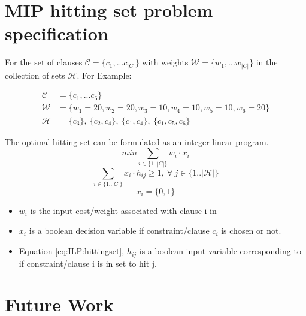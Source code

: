 \documentclass{article}
\newcommand\m[1]{\mathcal{#1}}
\begin{document}
\newpage
\section{MIP hitting set problem specification}
For the set of clauses $ \m{C} = \{c_1, ... c_{|C|}\}$ with weights $\m{W} = \{w_1, ... w_{|C|}\}$ in the collection of sets $\m{H}$. For Example:

\begin{equation} \label{mip:example}
  \begin{split}
    \m{C} &= \{c_1, ... c_6 \}  \\
    \m{W} &= \{w_1 = 20, w_2 = 20,  w_3 = 10,  w_4 = 10,  w_5 = 10,  w_6 = 20\} \\
    \m{H} &= \{c_3 \},\ \{c_2, c_4\},\ \{c_1, c_4\},\ \{c_1, c_5, c_6\} 
  \end{split}
  \end{equation}

The optimal hitting set can be formulated as an integer linear program.
\begin{equation} \label{eq:ILP:objective}
  min \sum_{ i \in \{1..|C|\}} w_i \cdot x_i
\end{equation}
\begin{equation} \label{eq:ILP:hittingset}
  \sum_{i \in \{1..|C|\}} x_i \cdot h_{ij} \geq 1, \  \forall \ j \in \{1..|\m{H}|\}
\end{equation}
\begin{equation} \label{eq:ILP:bool:xi}
  x_i = \{0,1\}
\end{equation}

\begin{itemize}
  \item $w_i$ is the input cost/weight associated with clause i in
  \item $x_i$ is a boolean decision variable if constraint/clause $c_i$ is chosen or not.
  \item Equation \ref{eq:ILP:hittingset}, $h_{ij}$ is a boolean input variable corresponding to if constraint/clause i is in set to hit j.
\end{itemize}

\newpage
\section{Future Work}

\newpage


\end{document}
